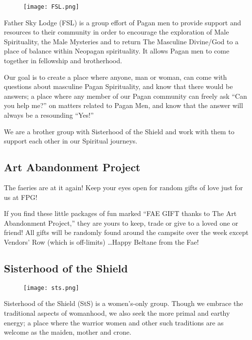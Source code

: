 \documentclass[9pt,twoside,openright,final,article,letterpaper]{memoir}
\let\oldsubsection=\subsection
\renewcommand{\subsection}[1]{%
  \vspace{6pt}
  \needspace{1.25in}
  \oldsubsection{#1}
  \nopagebreak}
\begin{document}
\begin{multicols}{2}
  \begingroup
  \setlength{\columnsep}{6pt}%
  \begin{wrapfigure}{r}{.5\columnwidth}
    \texttt{[image: FSL.png]}
  \end{wrapfigure}

  Father Sky Lodge (FSL) is a group effort of Pagan men to provide
  support and resources to their community in order to encourage the
  exploration of Male Spirituality, the Male Mysteries and to return The
  Masculine Divine/God to a place of balance within Neopagan
  spirituality. It allows Pagan men to come together in fellowship and
  brotherhood.

  Our goal is to create a place where anyone, man or woman, can come
  with questions about masculine Pagan Spirituality, and know that
  there would be answers; a place where any member of our Pagan
  community can freely ask ``Can you help me?'' on matters related to
  Pagan Men, and know that the answer will always be a resounding
  ``Yes!''

  We are a brother group with Sisterhood of the Shield and work with
  them to support each other in our Spiritual journeys.

  \endgroup

  \subsection{Art Abandonment Project}

  The faeries are at it again! Keep your eyes open for random gifts of
  love just for us at FPG!

  If you find these little packages of fun marked ``FAE GIFT thanks to
  The Art Abandonment Project,'' they are yours to keep, trade or give
  to a loved one or friend!  All gifts will be randomly found around
  the campsite over the week except Vendors' Row (which is off-limits)
  \ldots Happy Beltane from the Fae!

  \subsection{Sisterhood of the Shield}

  \begingroup
  \setlength{\columnsep}{6pt}%
  \begin{wrapfigure}{l}{.5\columnwidth}
    \texttt{[image: sts.png]}
  \end{wrapfigure}

  Sisterhood of the Shield (StS) is a women’s-only group. Though we
  embrace the traditional aspects of womanhood, we also seek the more
  primal and earthy energy; a place where the warrior women and other
  such traditions are as welcome as the maiden, mother and crone.


\end{multicols}
\end{document}
